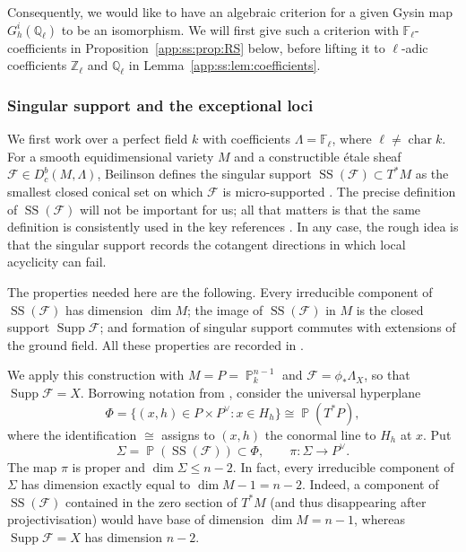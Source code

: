 \documentclass[a4paper,11pt, twoside,reqno]{amsart}
\theoremstyle{plain}
\theoremstyle{definition}
\theoremstyle{remark}
\newcommand{\ZZ}{\mathbb{Z}}
\newcommand{\QQ}{\mathbb{Q}}
\DeclareMathOperator{\PP}{\mathbb{P}}
\renewcommand{\leq}{\leqslant}
\newcommand{\FF}{\mathbb{F}}
\numberwithin{equation}{section}
\begin{document}
Consequently, we would like to have an algebraic criterion
for a given Gysin map $G_h^i(\QQ_\ell)$ to be an isomorphism.
We will first give such a criterion with $\FF_\ell$-coefficients
in Proposition~\ref{app:ss:prop:RS} below,
before lifting it to $\ell$-adic coefficients $\ZZ_\ell$ and $\QQ_\ell$
in Lemma~\ref{app:ss:lem:coefficients}.

\subsubsection{Singular support and the exceptional loci}
We first work over a perfect field $k$ with coefficients
$\Lambda=\FF_\ell$, where $\ell\neq\operatorname{char}k$.
For a smooth equidimensional variety $M$
and a constructible \'etale sheaf $\mathcal F\in D^b_c(M,\Lambda)$,
Beilinson defines
the singular support $\operatorname{SS}(\mathcal F)\subset T^*M$ as the smallest closed
conical set on which $\mathcal F$ is micro-supported
\cite[\S\S1.2--1.3]{Bei}.
The precise definition of $\operatorname{SS}(\mathcal F)$ will not be important for us;
all that matters is that the same definition is consistently used in
the key references \cite{Bei,HY,RS}.
In any case, the rough idea is that the singular support records the cotangent directions in which local acyclicity can fail.

The properties needed here are the following. Every irreducible
component of $\operatorname{SS}(\mathcal F)$ has dimension $\dim M$;
the image of $\operatorname{SS}(\mathcal F)$ in $M$ is
the closed support $\operatorname{Supp} \mathcal F$;
and formation of singular support commutes with extensions
of the ground field. All these properties are recorded in \cite[Theorems 1.3, 1.4(iii), and
Lemma 2.3(iii)]{Bei}.

We apply this construction with $M=P=\PP^{n-1}_k$ and $\mathcal F=\phi_*\Lambda_X$,
so that $\operatorname{Supp} \mathcal F=X$.
Borrowing notation from \cite[Theorem~2.2 and its proof]{RS},
consider the universal hyperplane
\[
 \Phi=\{(x,h)\in P\times P^\vee:x\in H_h\}
       \cong \PP(T^*P),
\]
where the identification $\cong$ assigns to $(x,h)$ the
conormal line to $H_h$ at $x$. Put
\begin{equation}\label{app:ss:eq:Sigma}
 \Sigma=\PP(\operatorname{SS}(\mathcal F))\subset \Phi,
 \qquad \pi:\Sigma\longrightarrow P^\vee.
\end{equation}
The map $\pi$ is proper and $\dim\Sigma\leq n-2$. In fact, every
irreducible component of $\Sigma$ has dimension exactly equal to
$\dim M - 1 = n-2$.
Indeed, a component of $\operatorname{SS}(\mathcal F)$
contained in the zero section of $T^*M$
(and thus disappearing after projectivisation)
would have base of dimension $\dim M = n-1$,
whereas $\operatorname{Supp} \mathcal F=X$ has dimension $n-2$.
\end{document}
